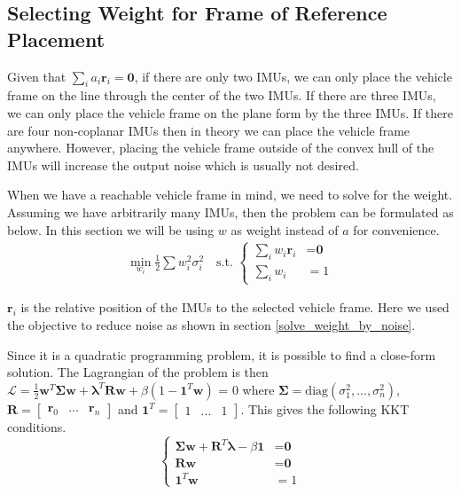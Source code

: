 \documentclass[conference]{IEEEtran}
\begin{document}
\subsection{Selecting Weight for Frame of Reference Placement}

Given that $\sum_i{a_i \textbf{r}_i} = \textbf{0}$, if there are only two IMUs, we can only place the vehicle frame on the line through the center of the two IMUs. If there are three IMUs, we can only place the vehicle frame on the plane form by the three IMUs. If there are four non-coplanar IMUs then in theory we can place the vehicle frame anywhere. However, placing the vehicle frame outside of the convex hull of the IMUs will increase the output noise which is usually not desired.

When we have a reachable vehicle frame in mind, we need to solve for the weight. Assuming we have arbitrarily many IMUs, then the problem can be formulated as below. In this section we will be using $w$ as weight instead of $a$ for convenience.
\begin{equation}
\begin{split}
    \min_{w_i}{\frac{1}{2} \sum{w_i^2 \sigma_i^2}} \quad \text{s.t. }
    \begin{cases}
      \sum_i{w_i \textbf{r}_i} &= \textbf{0} \\
      \sum_i{w_i} &= 1
    \end{cases}
\end{split}
\end{equation}

$\textbf{r}_i$ is the relative position of the IMUs to the selected vehicle frame. Here we used the objective to reduce noise as shown in section \ref{solve_weight_by_noise}.

Since it is a quadratic programming problem, it is possible to find a close-form solution. The Lagrangian of the problem is then $\mathcal{L} = \frac{1}{2}\textbf{w}^T \bm{\Sigma} \textbf{w} + \bm{\lambda}^T \textbf{R}\textbf{w} + \beta \left( 1 - \textbf{1}^T \textbf{w} \right)$ = 0 where $\bm{\Sigma} = \text{diag}(\sigma_1^2, ..., \sigma_n^2)$, $\textbf{R} = \left[\begin{matrix} \textbf{r}_0 & ... & \textbf{r}_n\end{matrix}\right]$ and $\textbf{1}^T = \left[\begin{matrix}1 & ... & 1\end{matrix}\right]$. This gives the following KKT conditions.
\begin{equation}
\begin{cases}
  \bm{\Sigma}\textbf{w} + \textbf{R}^T \bm{\lambda} - \beta \textbf{1} &= \textbf{0} \\
  \textbf{R} \textbf{w} &= \textbf{0} \\
  \textbf{1}^T \textbf{w} &= 1
\end{cases}
\end{equation}
\end{document}

